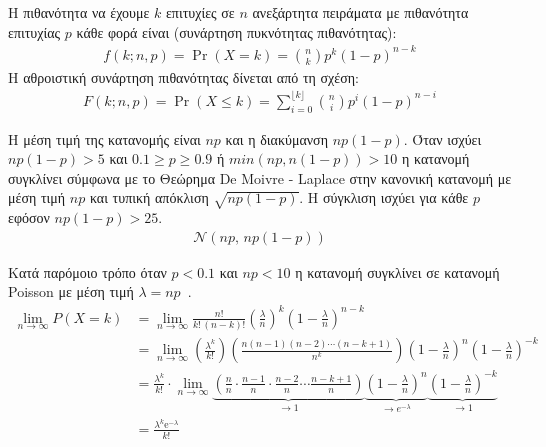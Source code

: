 \documentclass[12pt]{report}
\begin{document}
Η πιθανότητα να έχουμε \(k\) επιτυχίες σε \(n\) ανεξάρτητα πειράματα με πιθανότητα επιτυχίας \(p\) κάθε φορά είναι (συνάρτηση πυκνότητας πιθανότητας):
\begin{align*}
f(k;n,p)=\Pr(X=k)={\binom {n}{k}}p^{k}(1-p)^{n-k}
\end{align*}
Η αθροιστική συνάρτηση πιθανότητας δίνεται από τη σχέση:
\begin{align*}
F(k;n,p)=\Pr(X \leq k)=\sum _{i=0}^{\lfloor k\rfloor }\binom {n}{i}p^{i}(1-p)^{n-i}
\end{align*}

Η μέση τιμή της κατανομής είναι \(np\) και η διακύμανση \(np(1-p)\). Όταν ισχύει \(np(1-p)>5\) και \(0.1 \geq p \geq 0.9\) ή \(min(np,n(1-p))>10\) η κατανομή συγκλίνει σύμφωνα με το Θεώρημα \textlatin{De Moivre - Laplace} στην κανονική κατανομή με μέση τιμή \(np\) και τυπική απόκλιση \(\sqrt{np(1-p)}\). Η σύγκλιση ισχύει για κάθε \(p\) εφόσον \(np(1-p)>25\).
\begin{align*}
\mathcal {N}(np,\,np(1-p))
\end{align*}

Κατά παρόμοιο τρόπο όταν \(p<0.1\) και \(np<10\) η κατανομή συγκλίνει σε κατανομή \textlatin{Poisson} με μέση τιμή \(\lambda=np\)~\cite{book:07}.
\begin{align*}
\lim _{n\to \infty }P(X=k)&=\lim _{n\to \infty }{\frac {n!}{k!\,(n-k)!}}\left({\frac {\lambda }{n}}\right)^{k}\left(1-{\frac {\lambda }{n}}\right)^{n-k}\\&=\lim _{n\to \infty }\left({\frac {\lambda ^{k}}{k!}}\right)\left({\frac {n(n-1)(n-2)\cdots (n-k+1)}{n^{k}}}\right)\left(1-{\frac {\lambda }{n}}\right)^{n}\left(1-{\frac {\lambda }{n}}\right)^{-k}\\&={\frac {\lambda ^{k}}{k!}}\cdot \lim _{n\to \infty }\underbrace {\left({\frac {n}{n}}\cdot {\frac {n-1}{n}}\cdot {\frac {n-2}{n}}\cdots {\frac {n-k+1}{n}}\right)} _{\to 1}\underbrace {\left(1-{\frac {\lambda }{n}}\right)^{n}} _{\to e^{-\lambda }}\underbrace {\left(1-{\frac {\lambda }{n}}\right)^{-k}} _{\to 1}\\&={\frac {\lambda^{k} \mathrm {e} ^{-\lambda }}{k!}}
\end{align*}
\end{document}
